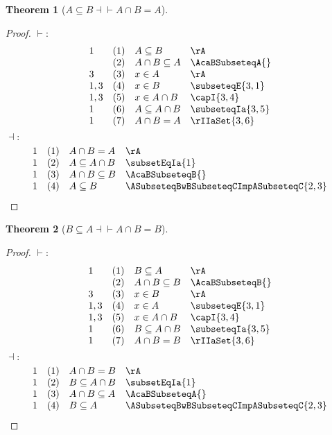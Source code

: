 \documentclass{book}
\theoremstyle{plain}
\newtheorem{theorem}{Theorem}
\theoremstyle{remark}
\theoremstyle{definition}
\begin{document}
\label{ASubseteqBEqvAcaBEqualsA}
\begin{theorem}[\(A \subseteq B \dashv\vdash A \cap B = A\)]
\end{theorem}
\begin{proof}
    \(\vdash:\)
    \[
        \begin{array}{llll}
	   1 & (1) & A \subseteq B & \rA \\
	    & (2) & A\cap B\subseteq A & \AcaBSubseteqA{} \\
	   3 & (3) & x\in A & \rA \\		
	1,3 & (4) & x\in B & \subseteqE{3,1} \\		
	1,3 & (5) & x\in A\cap B & \capI{3,4} \\	
	   1 & (6) & A\subseteq A\cap B & \subseteqIa{3,5} \\			
	   1 & (7) & A \cap B = A & \rIIaSet{3,6} \\
        \end{array}
    \]
    \(\dashv:\)
    \[
        \begin{array}{llll}
	   1 & (1) & A\cap B = A & \rA \\
	   1 & (2) & A\subseteq A\cap B & \subsetEqIa{1} \\			
	   1 & (3) & A\cap B\subseteq B & \AcaBSubseteqB{} \\	
	   1 & (4) & A\subseteq B & \ASubseteqBwBSubseteqCImpASubseteqC{2,3} \\
	\end{array}
    \]
\end{proof}

\label{BSubseteqAEqvAcaBEqualsB}
\begin{theorem}[\(B \subseteq A \dashv\vdash A \cap B = B\)]
\end{theorem}
\begin{proof}
    \(\vdash:\)
    \[
        \begin{array}{llll}
	   1 & (1) & B \subseteq A & \rA \\
	    & (2) & A\cap B\subseteq B & \AcaBSubseteqB{} \\
	   3 & (3) & x\in B & \rA \\		
	1,3 & (4) & x\in A & \subseteqE{3,1} \\		
	1,3 & (5) & x\in A\cap B & \capI{3,4} \\	
	   1 & (6) & B\subseteq A\cap B & \subseteqIa{3,5} \\			
	   1 & (7) & A \cap B = B & \rIIaSet{3,6} \\
        \end{array}
    \]
    \(\dashv:\)
    \[
        \begin{array}{llll}
	   1 & (1) & A\cap B = B & \rA \\
	   1 & (2) & B\subseteq A\cap B & \subsetEqIa{1} \\			
	   1 & (3) & A\cap B\subseteq A & \AcaBSubseteqA{} \\	
	   1 & (4) & B\subseteq A & \ASubseteqBwBSubseteqCImpASubseteqC{2,3} \\
        \end{array}
    \]
\end{proof}
\end{document}
